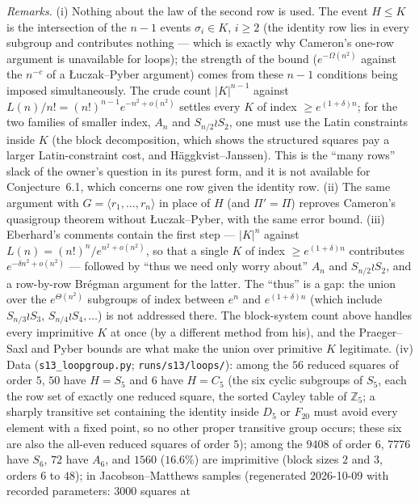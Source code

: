 \emph{Remarks.}  (i) Nothing about the law of the second row is used.
The event $H\le K$ is the intersection of the $n-1$ events
$\sigma_i\in K$, $i\ge2$ (the identity row lies in every subgroup and
contributes nothing --- which is exactly why Cameron's one-row argument
is unavailable for loops); the strength of the bound
($e^{-\Omega(n^2)}$ against the $n^{-c}$ of a {\L}uczak--Pyber argument)
comes from these $n-1$ conditions being imposed simultaneously.  The
crude count $|K|^{n-1}$ against $L(n)/n!=(n!)^{n-1}e^{-n^2+o(n^2)}$
settles every $K$ of index $\ge e^{(1+\delta)n}$; for the two families
of smaller index, $A_n$ and $S_{n/2}\wr S_2$, one must use the Latin
constraints inside $K$ (the block decomposition, which shows the
structured squares pay a larger Latin-constraint cost, and
H\"aggkvist--Janssen).  This is the ``many rows'' slack of the owner's
question in its purest form, and it is not available for
Conjecture~6.1, which concerns one row given the identity row.  (ii) The same argument with $G=\langle r_1,\dots,r_n\rangle$
in place of $H$ (and $\Pi'=\Pi$) reproves Cameron's quasigroup theorem
\cite{Cam92} without {\L}uczak--Pyber, with the same error bound.
(iii) Eberhard's comments \cite{Cam15} contain the first step
--- $|K|^n$ against $L(n)=(n!)^n/e^{n^2+o(n^2)}$, so that a single $K$
of index $\ge e^{(1+\delta)n}$ contributes $e^{-\delta n^2+o(n^2)}$ ---
followed by ``thus we need only worry about'' $A_n$ and
$S_{n/2}\wr S_2$, and a row-by-row Br\'egman argument for the latter.
The ``thus'' is a gap: the union over the $e^{\Theta(n^2)}$
subgroups of index between $e^{n}$ and $e^{(1+\delta)n}$ (which
include $S_{n/3}\wr S_3$, $S_{n/4}\wr S_4,\dots$) is not addressed
there.  The block-system count above handles every imprimitive $K$ at
once (by a different method from his), and the Praeger--Saxl and Pyber
bounds are what make the union over primitive $K$ legitimate.
(iv) Data (\texttt{s13\_loopgroup.py}; \texttt{runs/s13/loops/}): among
the $56$ reduced squares of order $5$, $50$ have $H=S_5$ and $6$ have
$H=C_5$ (the six cyclic subgroups of $S_5$, each the row set of exactly
one reduced square, the sorted Cayley table of $\mathbb Z_5$; a
sharply transitive set containing the identity inside $D_5$ or $F_{20}$
must avoid every element with a fixed point, so no other proper
transitive group occurs; these six are also the all-even reduced
squares of order $5$); among the $9408$ of order $6$, $7776$ have
$S_6$, $72$ have $A_6$, and $1560$ ($16.6\%$) are imprimitive (block
sizes $2$ and $3$, orders $6$ to $48$); in Jacobson--Matthews samples
(regenerated 2026-10-09 with recorded parameters: $3000$ squares at

